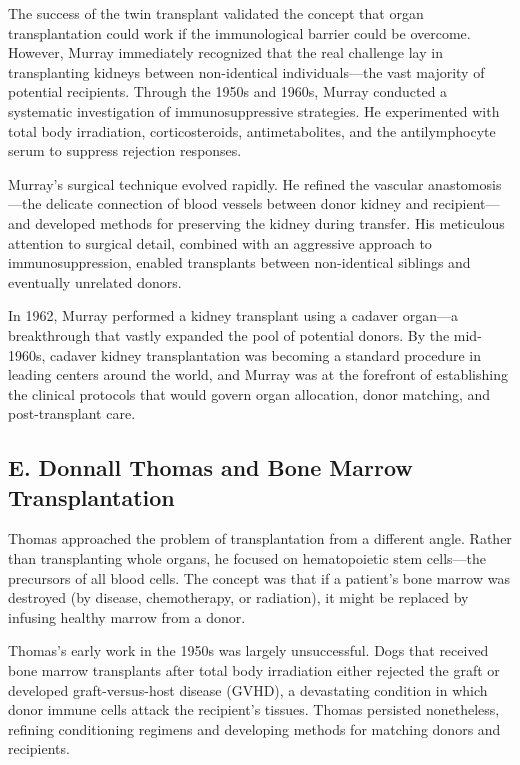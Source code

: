 The success of the twin transplant validated the concept that organ transplantation could work if the immunological barrier could be overcome. However, Murray immediately recognized that the real challenge lay in transplanting kidneys between non-identical individuals---the vast majority of potential recipients. Through the 1950s and 1960s, Murray conducted a systematic investigation of immunosuppressive strategies. He experimented with total body irradiation, corticosteroids, antimetabolites, and the antilymphocyte serum to suppress rejection responses.

Murray's surgical technique evolved rapidly. He refined the vascular anastomosis---the delicate connection of blood vessels between donor kidney and recipient---and developed methods for preserving the kidney during transfer. His meticulous attention to surgical detail, combined with an aggressive approach to immunosuppression, enabled transplants between non-identical siblings and eventually unrelated donors.

In 1962, Murray performed a kidney transplant using a cadaver organ---a breakthrough that vastly expanded the pool of potential donors. By the mid-1960s, cadaver kidney transplantation was becoming a standard procedure in leading centers around the world, and Murray was at the forefront of establishing the clinical protocols that would govern organ allocation, donor matching, and post-transplant care.

\subsection{E. Donnall Thomas and Bone Marrow Transplantation}

Thomas approached the problem of transplantation from a different angle. Rather than transplanting whole organs, he focused on hematopoietic stem cells---the precursors of all blood cells. The concept was that if a patient's bone marrow was destroyed (by disease, chemotherapy, or radiation), it might be replaced by infusing healthy marrow from a donor.

Thomas's early work in the 1950s was largely unsuccessful. Dogs that received bone marrow transplants after total body irradiation either rejected the graft or developed graft-versus-host disease (GVHD), a devastating condition in which donor immune cells attack the recipient's tissues. Thomas persisted nonetheless, refining conditioning regimens and developing methods for matching donors and recipients.

